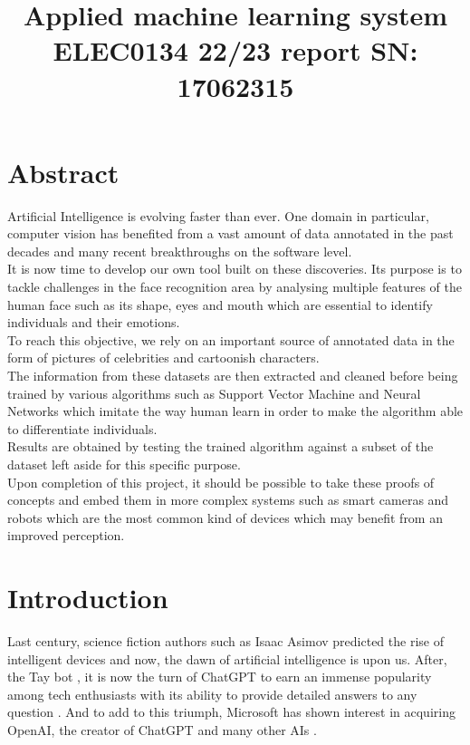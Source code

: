 \documentclass[a4paper,12pt,twoside,twocolumn]{article}
\date{}
\title{Applied machine learning system ELEC0134 22/23 report SN: 17062315}
\begin{document}
\setlength\parindent{0pt}
\maketitle

\section{Abstract}
\label{sec:orgea32388}

Artificial Intelligence is evolving faster than ever. One domain in particular, computer vision has benefited from a vast amount of data annotated in the past decades and many recent breakthroughs on the software level.\\

It is now time to develop our own tool built on these discoveries. Its purpose is to tackle challenges in the face recognition area by analysing multiple features of the human face such as its shape, eyes and mouth which are essential to identify individuals and their emotions.\\

To reach this objective, we rely on an important source of annotated data in the form of pictures of celebrities and cartoonish characters.\\

The information from these datasets are then extracted and cleaned before being trained by various algorithms such as Support Vector Machine and Neural Networks which imitate the way human learn in order to make the algorithm able to differentiate individuals.\\

Results are obtained by testing the trained algorithm against a subset of the dataset left aside for this specific purpose.\\

Upon completion of this project, it should be possible to take these proofs of concepts and embed them in more complex systems such as smart cameras and robots which are the most common kind of devices which may benefit from an improved perception.\\

\section{Introduction}
\label{sec:orgc2dc8e6}

Last century, science fiction authors such as Isaac Asimov predicted the rise of intelligent devices \autocite{asimov_akinyemi_2000} \autocite{ai_eco_impact} and now, the dawn of artificial intelligence is upon us. After, the Tay bot \autocite{tay}, it is now the turn of ChatGPT to earn an immense popularity among tech enthusiasts with its ability to provide detailed answers to any question \autocite{chatgpt-detect} \autocite{chatpgt-teach}. And to add to this triumph, Microsoft has shown interest in acquiring OpenAI, the creator of ChatGPT and many other AIs \autocite{microsoft_buy_openai}.\\
\end{document}

